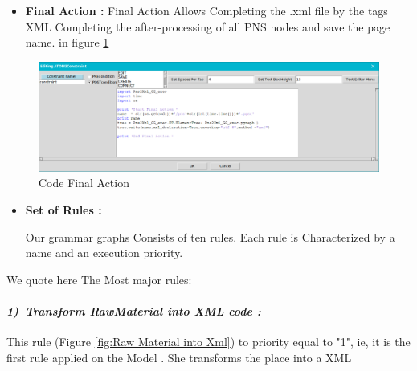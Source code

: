 \begin{itemize}
\item \textbf{Final Action : } Final Action Allows Completing the .xml file by the tags
XML Completing the after-processing of all PNS nodes and save the page name. in figure \ref{fig:Code Final Action} 
   
\end{itemize}

\begin{figure}[th]
	\centering  %
 	\includegraphics[scale=0.38]{Chapiter3/img/FinAct}
	\caption{\label{fig:Code Final Action}Code Final Action}
\end{figure} 
\pagebreak
\begin{itemize}
\item \textbf{ Set of Rules : } 
 
Our grammar graphs Consists of ten rules. Each
rule is Characterized by a name and an execution priority. 

\end{itemize}
 We quote here The Most major rules: 
\paragraph{\emph{1)~Transform RawMaterial into XML code :} }
This rule (Figure \ref{fig:Raw Material into Xml}) to priority equal to "1", ie, 
it is the first rule applied on the Model . She transforms the place into a XML

